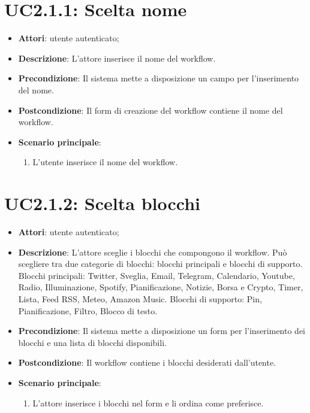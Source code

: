 \section{UC2.1.1: Scelta nome}
\label{UC2.1.1}
\begin{itemize}
	\item \textbf{Attori}: utente autenticato;
	\item \textbf{Descrizione}: L'attore inserisce il nome del workflow.
	\item \textbf{Precondizione}: Il sistema mette a disposizione un campo per l'inserimento del nome.
	\item \textbf{Postcondizione}: Il form di creazione del workflow contiene il nome del workflow.
	\item \textbf{Scenario principale}:
	\begin{enumerate} \item L'utente inserisce il nome del workflow.\end{enumerate}
\end{itemize}

\section{UC2.1.2: Scelta blocchi}
\label{UC2.1.2}
\begin{itemize}
	\item \textbf{Attori}: utente autenticato;
	\item \textbf{Descrizione}: L'attore sceglie i blocchi che compongono il workflow. Può scegliere tra due categorie di blocchi: blocchi principali e blocchi di supporto.
	Blocchi principali: Twitter, Sveglia, Email, Telegram, Calendario, Youtube, Radio, Illuminazione, Spotify, Pianificazione, Notizie, Borsa e Crypto, Timer, Lista, Feed RSS, Meteo, Amazon Music.
	Blocchi di supporto: Pin, Pianificazione, Filtro, Blocco di testo.
	\item \textbf{Precondizione}: Il sistema mette a disposizione un form per l'inserimento dei blocchi e una lista di blocchi disponibili.
	\item \textbf{Postcondizione}: Il workflow contiene i blocchi desiderati dall'utente.
	\item \textbf{Scenario principale}:
	\begin{enumerate} \item L'attore inserisce i blocchi nel form e li ordina come preferisce.\end{enumerate}
\end{itemize}

